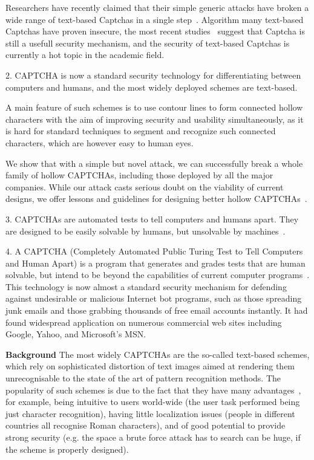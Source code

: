 Researchers have recently claimed that their simple generic attacks have broken a wide range of text-based Captchas in a single step~\cite{Bursztein2014The,Gao2016A}. Algorithm many text-based Captchas have proven insecure, the most recent studies~\cite{Thomas2013Trafficking,Bursztein2014Easy} suggest that Captcha is still a usefull security mechanism, and the security of text-based Captchas is currently a hot topic in the academic field.~\cite{Gao2017Research}

2. CAPTCHA is now a standard security technology for differentiating between computers and humans, and the most widely deployed schemes are text-based.

A main feature of such schemes is to use contour lines to form connected hollow characters with the aim of improving security and usability simultaneously, as it is hard for standard techniques to segment and recognize such connected characters, which are however easy to human eyes.

We show that with a simple but novel attack, we can successfully break a whole family of hollow CAPTCHAs, including those deployed by all the major companies. While our attack casts serious doubt on the viability of current designs, we offer lessons and guidelines for designing better hollow CAPTCHAs~\cite{Gao2013The}.

3. CAPTCHAs are automated tests to tell computers and humans apart. They are designed to be easily solvable by humans, but unsolvable by machines~\cite{Stark2015CAPTCHA}.

4. A CAPTCHA (Completely Automated Public Turing Test to Tell Computers and Human Apart) is a program that generates and grades tests that are human solvable, but intend to be beyond the capabilities of current computer programs~\cite{Von2004Telling}. This technology is now almost a standard security mechanism for defending against undesirable or malicious Internet bot programs, such as those spreading junk emails and those grabbing thousands of free email accounts instantly. It had found widespread application on numerous commercial web sites including Google, Yahoo, and Microsoft's MSN.

\textbf{Background} The most widely CAPTCHAs are the so-called text-based schemes, which rely on sophisticated distortion of text images aimed at rendering them unrecognisable to the state of the art of pattern recognition methods. The popularity of such schemes is due to the fact that they have many advantages~\cite{Chellapilla2005Building}, for example, being intuitive to users world-wide (the user task performed being just character recognition), having little localization issues (people in different countries all recognise Roman characters), and of good potential to provide strong security (e.g. the space a brute force attack has to search can be huge, if the scheme is properly designed).~\cite{Yan2008A} 